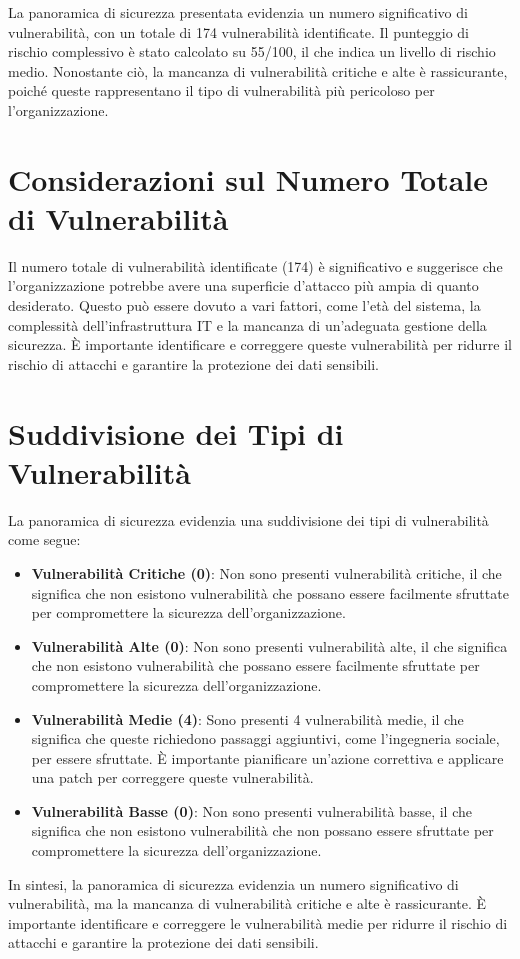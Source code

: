 La panoramica di sicurezza presentata evidenzia un numero significativo di vulnerabilità, con un totale di 174 vulnerabilità identificate. Il punteggio di rischio complessivo è stato calcolato su 55/100, il che indica un livello di rischio medio. Nonostante ciò, la mancanza di vulnerabilità critiche e alte è rassicurante, poiché queste rappresentano il tipo di vulnerabilità più pericoloso per l'organizzazione.

\section{Considerazioni sul Numero Totale di Vulnerabilità}

Il numero totale di vulnerabilità identificate (174) è significativo e suggerisce che l'organizzazione potrebbe avere una superficie d'attacco più ampia di quanto desiderato. Questo può essere dovuto a vari fattori, come l'età del sistema, la complessità dell'infrastruttura IT e la mancanza di un'adeguata gestione della sicurezza. È importante identificare e correggere queste vulnerabilità per ridurre il rischio di attacchi e garantire la protezione dei dati sensibili.

\section{Suddivisione dei Tipi di Vulnerabilità}

La panoramica di sicurezza evidenzia una suddivisione dei tipi di vulnerabilità come segue:
\begin{itemize}
\item \textbf{Vulnerabilità Critiche (0)}: Non sono presenti vulnerabilità critiche, il che significa che non esistono vulnerabilità che possano essere facilmente sfruttate per compromettere la sicurezza dell'organizzazione.
\item \textbf{Vulnerabilità Alte (0)}: Non sono presenti vulnerabilità alte, il che significa che non esistono vulnerabilità che possano essere facilmente sfruttate per compromettere la sicurezza dell'organizzazione.
\item \textbf{Vulnerabilità Medie (4)}: Sono presenti 4 vulnerabilità medie, il che significa che queste richiedono passaggi aggiuntivi, come l'ingegneria sociale, per essere sfruttate. È importante pianificare un'azione correttiva e applicare una patch per correggere queste vulnerabilità.
\item \textbf{Vulnerabilità Basse (0)}: Non sono presenti vulnerabilità basse, il che significa che non esistono vulnerabilità che non possano essere sfruttate per compromettere la sicurezza dell'organizzazione.
\end{itemize}
In sintesi, la panoramica di sicurezza evidenzia un numero significativo di vulnerabilità, ma la mancanza di vulnerabilità critiche e alte è rassicurante. È importante identificare e correggere le vulnerabilità medie per ridurre il rischio di attacchi e garantire la protezione dei dati sensibili.


